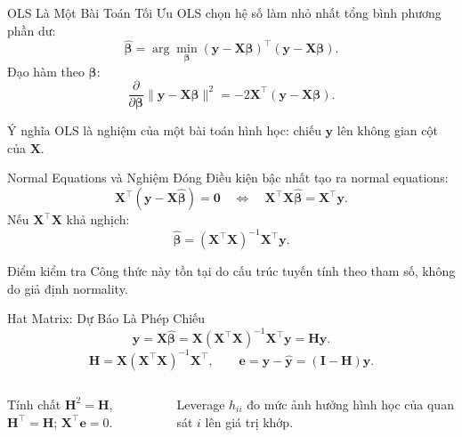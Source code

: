 \documentclass[aspectratio=169,professionalfonts]{beamer}
\newcommand{\assumption}[2]{%
  \begin{block}{#1}
    #2
  \end{block}
}
\newcommand{\mathnote}[1]{%
  \begin{block}{Ý nghĩa}
    #1
  \end{block}
}
\begin{document}
\begin{frame}{OLS Là Một Bài Toán Tối Ưu}
  \small
  OLS chọn hệ số làm nhỏ nhất tổng bình phương phần dư:
  \[
    \hat{\boldsymbol{\beta}}
    =
    \arg\min_{\boldsymbol{\beta}}
    (\mathbf{y}-\mathbf{X}\boldsymbol{\beta})^{\top}
    (\mathbf{y}-\mathbf{X}\boldsymbol{\beta}).
  \]
  Đạo hàm theo $\boldsymbol{\beta}$:
  \[
    \frac{\partial}{\partial\boldsymbol{\beta}}
    \|\mathbf{y}-\mathbf{X}\boldsymbol{\beta}\|^2
    =
    -2\mathbf{X}^{\top}(\mathbf{y}-\mathbf{X}\boldsymbol{\beta}).
  \]
  \mathnote{OLS là nghiệm của một bài toán hình học: chiếu $\mathbf{y}$ lên không gian cột của $\mathbf{X}$.}
\end{frame}

\begin{frame}{Normal Equations và Nghiệm Đóng}
  \small
  Điều kiện bậc nhất tạo ra normal equations:
  \[
    \mathbf{X}^{\top}(\mathbf{y}-\mathbf{X}\hat{\boldsymbol{\beta}})=\mathbf{0}
    \quad\Longleftrightarrow\quad
    \mathbf{X}^{\top}\mathbf{X}\hat{\boldsymbol{\beta}}=\mathbf{X}^{\top}\mathbf{y}.
  \]
  Nếu $\mathbf{X}^{\top}\mathbf{X}$ khả nghịch:
  \[
    \hat{\boldsymbol{\beta}}
    =
    (\mathbf{X}^{\top}\mathbf{X})^{-1}\mathbf{X}^{\top}\mathbf{y}.
  \]
  \begin{block}{Điểm kiểm tra}
    Công thức này tồn tại do cấu trúc tuyến tính theo tham số, không do giả định normality.
  \end{block}
\end{frame}

\begin{frame}{Hat Matrix: Dự Báo Là Phép Chiếu}
  \small
  \[
    \hat{\mathbf{y}}=\mathbf{X}\hat{\boldsymbol{\beta}}
    =\mathbf{X}(\mathbf{X}^{\top}\mathbf{X})^{-1}\mathbf{X}^{\top}\mathbf{y}
    =\mathbf{H}\mathbf{y}.
  \]
  \[
    \mathbf{H}=\mathbf{X}(\mathbf{X}^{\top}\mathbf{X})^{-1}\mathbf{X}^{\top},
    \qquad
    \mathbf{e}=\mathbf{y}-\hat{\mathbf{y}}=(\mathbf{I}-\mathbf{H})\mathbf{y}.
  \]
  \begin{columns}[T,onlytextwidth]
      \assumption{Tính chất}{$\mathbf{H}^2=\mathbf{H}$, $\mathbf{H}^{\top}=\mathbf{H}$; $\mathbf{X}^{\top}\mathbf{e}=0$.}
      \assumption{Leverage}{$h_{ii}$ đo mức ảnh hưởng hình học của quan sát $i$ lên giá trị khớp.}
  \end{columns}
\end{frame}
\end{document}
